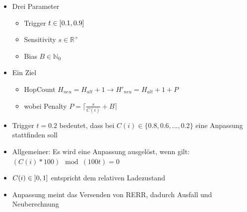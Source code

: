 \documentclass[11pt,handout,notes=only]{beamer}
\begin{document}
\begin{frame}{\insertsubsection}
\begin{itemize}
\item Drei Parameter\newline
\begin{itemize}
\item Trigger $t \in \interval{0.1}{0.9}$ \newline
\item Sensitivity $s \in \mathbb{R^{+}}$\newline
\item Bias $B \in \mathbb{N}_0$\newline
\end{itemize}
\item Ein Ziel\newline
\begin{itemize}
\item HopCount $H_{neu} = H_{alt} + 1 \rightarrow H'_{neu} = H_{alt} + 1 + P$ \newline
\item wobei Penalty $P = \lceil\frac{s}{C(i)} + B\rceil$\newline
\end{itemize}
\end{itemize}
\end{frame}

\begin{frame}{\insertsubsection}
\begin{itemize}
\item Trigger $t = 0.2$ bedeutet, dass bei $C(i) \in \{0.8,0.6,...,0.2\}$ eine Anpassung stattfinden soll\newline
\item Allgemeiner: Es wird eine Anpassung ausgelöst, wenn gilt: \newline $(C(i) * 100) \mod(100t) = 0$\newline
\item $C(i) \in \interval[open left]{0}{1}$ entspricht dem relativen Ladezustand\newline
\item Anpassung meint das Versenden von RERR, dadurch Ausfall und Neuberechnung
\end{itemize}
\end{frame}

\end{document}
